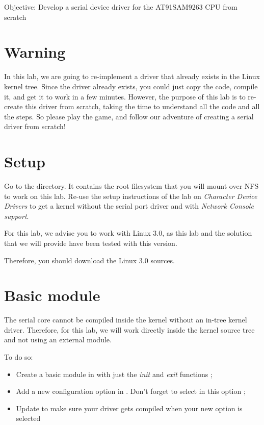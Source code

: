   {Objective: Develop a serial device driver for the
  AT91SAM9263 CPU from scratch}

\section{Warning}

In this lab, we are going to re-implement a driver that already exists
in the Linux kernel tree. Since the driver already exists, you could
just copy the code, compile it, and get it to work in a few
minutes. However, the purpose of this lab is to re-create this driver
from scratch, taking the time to understand all the code and all the
steps. So please play the game, and follow our adventure of creating a
serial driver from scratch!

\section{Setup}

Go to the  directory. It
contains the root filesystem that you will mount over NFS to work on
this lab. Re-use the setup instructions of the lab on {\em Character
Device Drivers} to get a kernel without the serial port driver and
with {\em Network Console support}.

For this lab, we advise you to work with Linux 3.0, as this lab and the
solution that we will provide have been tested with this version.

Therefore, you should download the Linux 3.0 sources.

\section{Basic module}

The serial core cannot be compiled inside the kernel without an
in-tree kernel driver. Therefore, for this lab, we will work directly
inside the kernel source tree and not using an external module.

To do so:

\begin{itemize}

\item Create a basic module in  with
  just the \emph{init} and \emph{exit} functions ;

\item Add a new configuration option in
  . Don't forget to select
   in this option ;

\item Update  to make sure your
  driver gets compiled when your new option is selected

\end{itemize}

